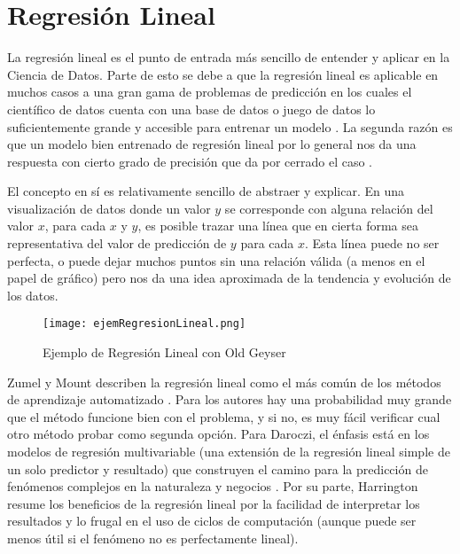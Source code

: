 \section{Regresión Lineal}
La regresión lineal es el punto de entrada más sencillo de entender y aplicar en la Ciencia de Datos. Parte de esto se debe a que la regresión lineal es aplicable en muchos casos a una gran gama de problemas de predicción en los cuales el científico de datos cuenta con una base de datos o juego de datos lo suficientemente grande y accesible para entrenar un modelo \cite{daroczi}. La segunda razón es que un modelo bien entrenado de regresión lineal por lo general nos da una respuesta con cierto grado de precisión que da por cerrado el caso \cite{leek}. 

El concepto en sí es relativamente sencillo de abstraer y explicar. En una visualización de datos donde un valor $y$ se corresponde con alguna relación del valor $x$, para cada $x$ y $y$, es posible trazar una línea que en cierta forma sea representativa del valor de predicción de $y$ para cada $x$. Esta línea puede no ser perfecta, o puede dejar muchos puntos sin una relación válida (a menos en el papel de gráfico) pero nos da una idea aproximada de la tendencia y evolución de los datos. \\

\begin{figure}[h!]
    \centering
    \texttt{[image: ejemRegresionLineal.png]}
    \caption{Ejemplo de Regresión Lineal con Old Geyser}
\end{figure}

Zumel y Mount describen la regresión lineal como el más común de los métodos de aprendizaje automatizado \cite{zumelMount}. Para los autores hay una probabilidad muy grande que el método funcione bien con el problema, y si no, es muy fácil verificar cual otro método probar como segunda opción. Para Daroczi, el énfasis está en los modelos de regresión multivariable (una extensión de la regresión lineal simple de un solo predictor y resultado) que construyen el camino para la predicción de fenómenos complejos en la naturaleza y negocios \cite{daroczi}. Por su parte, Harrington resume los beneficios de la regresión lineal \cite{harrington} por la facilidad de interpretar los resultados y lo frugal en el uso de ciclos de computación (aunque puede ser menos útil si el fenómeno no es perfectamente lineal).

